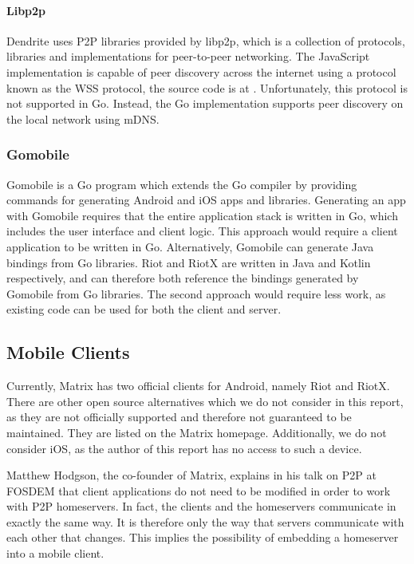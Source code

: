 \paragraph{Libp2p}
Dendrite uses \ac{P2P} libraries provided by libp2p, which is a collection of protocols, libraries and implementations for peer-to-peer networking\cite{libp2p}.
The JavaScript implementation is capable of peer discovery across the internet using a protocol known as the \ac{WSS} protocol, the source code is at .
Unfortunately, this protocol is not supported in Go\cite{libp2p_implementations}.
Instead, the Go implementation supports peer discovery on the local network using \ac{mDNS}.

\subsubsection{Gomobile}\label{sec:gomobile}
Gomobile is a Go program which extends the Go compiler by providing commands for generating Android and iOS apps and libraries\cite{gomobile}.
Generating an app with Gomobile requires that the entire application stack is written in Go, which includes the user interface and client logic.
This approach would require a client application to be written in Go.
Alternatively, Gomobile can generate Java bindings from Go libraries.
Riot and RiotX are written in Java and Kotlin respectively, and can therefore both reference the bindings generated by Gomobile from Go libraries.
The second approach would require less work, as existing code can be used for both the client and server.

\subsection{Mobile Clients}\label{sec:official_clients}
Currently, Matrix has two official clients for Android, namely Riot and RiotX.
There are other open source alternatives which we do not consider in this report, as they are not officially supported and therefore not guaranteed to be maintained.
They are listed on the Matrix homepage\cite{try_matrix}.
Additionally, we do not consider iOS, as the author of this report has no access to such a device.

Matthew Hodgson, the co-founder of Matrix, explains in his talk on \ac{P2P} at FOSDEM\cite{fosdem_event_p2p_matrix} that client applications do not need to be modified in order to work with \ac{P2P} homeservers.
In fact, the clients and the homeservers communicate in exactly the same way.
It is therefore only the way that servers communicate with each other that changes.
This implies the possibility of embedding a homeserver into a mobile client.

